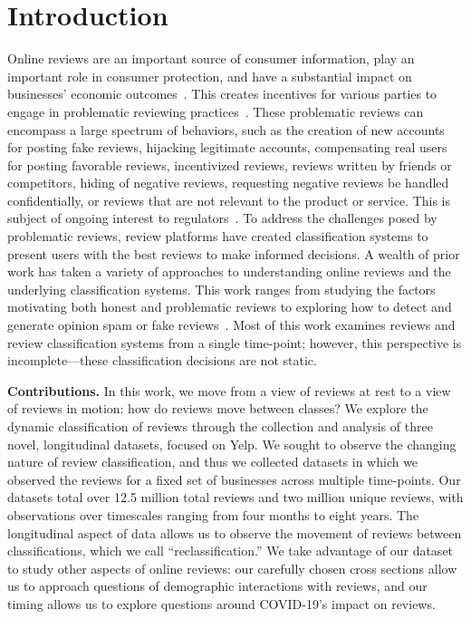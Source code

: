 \section{Introduction} \label{sec:rim:introduction}

Online reviews are an important source of consumer information, play an important role in consumer protection, and have a substantial impact on businesses' economic outcomes~\cite{luca2016reviews,anderson2012impact,un2003conpro}. This creates incentives for various parties to engage in problematic reviewing practices~\cite{streitfeld2012buy,miller19plastic}. These problematic reviews can encompass a large spectrum of behaviors, such as the creation of new accounts for posting fake reviews, hijacking legitimate accounts, compensating real users for posting favorable reviews, incentivized reviews, reviews written by friends or competitors, hiding of negative reviews, requesting negative reviews be handled confidentially, or reviews that are not relevant to the product or service. This is subject of ongoing interest to regulators~\cite{jindal2008opinion,yelpwhyrec,ftc21notice,ftc21fashion,yeung2021Bad}. To address the challenges posed by problematic reviews, review platforms have created classification systems to present users with the best reviews to make informed decisions. A wealth of prior work has taken a variety of approaches to understanding online reviews and the underlying classification systems. This work ranges from studying the factors motivating both honest and problematic reviews to exploring how to detect and generate opinion spam or fake reviews~\cite{jindal2008opinion,yoo2008motivates,baginski2014exploring}. Most of this work examines reviews and review classification systems from a single time-point; however, this perspective is incomplete---these classification decisions are not static.

\textbf{Contributions.} In this work, we move from a view of reviews at rest to a view of reviews in motion: how do reviews move between classes? We explore the dynamic classification of reviews through the collection and analysis of three novel, longitudinal datasets, focused on Yelp. We sought to observe the changing nature of review classification, and thus we collected datasets in which we observed the reviews for a fixed set of businesses across multiple time-points. Our datasets total over 12.5 million total reviews and two million unique reviews, with observations over timescales ranging from four months to eight years. The longitudinal aspect of data allows us to observe the movement of reviews between classifications, which we call ``reclassification.'' We take advantage of our dataset to study other aspects of online reviews: our carefully chosen cross sections allow us to approach questions of demographic interactions with reviews, and our timing allows us to explore questions around COVID-19's impact on reviews.

